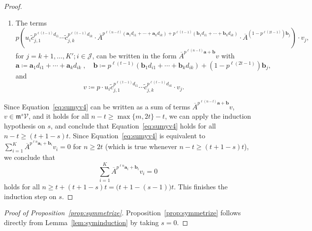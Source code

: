 \documentclass[letterpaper, 11pt, thm-restate]{article}
\numberwithin{equation}{section}
\newcommand{\mV}{\mathcal{V}}
\newcommand{\mJ}{\mathcal{J}}
\newcommand{\ba}{\boldsymbol{a}}
\newcommand{\bb}{\boldsymbol{b}}
\newcommand{\tc}{\widetilde{c}}
\newcommand{\oA}{\overline{A}}
\newcommand{\frm}{\mathfrak{m}}
\theoremstyle{definition}
\theoremstyle{definition}
\theoremstyle{definition}
\begin{document}
\begin{proof}
\begin{enumerate}[nosep, label=(\roman*)]
    the terms $\oA^{p^{\ell n} \ba_i + \bb_i} w_i, i = 1, \ldots, k$, can be written in the form $\oA^{p^{\ell (n-t)} \ba + \bb} v$, with
    \[
    \ba \coloneqq (p^{\ell n} - p^{\ell (n-t)}) \ba_i \;, \quad \bb \coloneqq \bb_i \;, \quad v \coloneqq w_i.
    \]
    Similarly, the terms $\oA^{p^{\ell n} \ba_i + \bb_i} v_i, i = K'+1, \ldots, K$, can be written in the form $\oA^{p^{\ell (n-t)} \ba + \bb} v$.
    \item
    The terms
    \[
    p \left( u_{i} \tc_{j,1}^{p^{\ell (t-1)}d_{i1}} \cdots \tc_{j,k}^{p^{\ell (t-1)} d_{ik}} \cdot \oA^{p^{\ell (n-t)}(\ba_1 d_{i1} + \cdots + \ba_k d_{ik}) + p^{\ell (t-1)} (\bb_1 d_{i1} + \cdots + \bb_k d_{ik})} \cdot \oA^{(1 - p^{\ell (2t-1)}) \bb_j} \right) \cdot v_j,
    \]
    for $j = k+1, \ldots, K'; i \in \mJ$,
    can be written in the form $\oA^{p^{\ell (n-t)} \ba + \bb} v$ with
    \[
    \ba \coloneqq \ba_1 d_{i1} + \cdots + \ba_k d_{ik} \;, \quad \bb \coloneqq p^{\ell (t-1)} (\bb_1 d_{i1} + \cdots + \bb_k d_{ik}) + (1 - p^{\ell (2t-1)}) \bb_j,
    \]
    and
    \[
    v \coloneqq p \cdot u_{i} \tc_{j,1}^{p^{\ell (t-1)}d_{i1}} \cdots \tc_{j,k}^{p^{\ell (t-1)} d_{ik}} \cdot v_j.
    \]
    \end{enumerate}
    
    Since Equation~\eqref{eq:sumyv4} can be written as a sum of terms $\oA^{p^{\ell (n-t)} \ba + \bb} v$, $v \in \frm^s \mV$, and it holds for all $n - t \geq \max\{m, 2t\} - t$, we can apply the induction hypothesis on $s$, and conclude that Equation~\eqref{eq:sumyv4} holds for all $n - t \geq (t+1-s)t$.
    Since Equation~\eqref{eq:sumyv4} is equivalent to $\sum_{i = 1}^K \oA^{p^{\ell n} \ba_i + \bb_i} v_i = 0$ for $n \geq 2t$ (which is true whenever $n - t \geq (t+1-s)t$), we conclude that 
    \[
    \sum_{i = 1}^K \oA^{p^{\ell n} \ba_i + \bb_i} v_i = 0
    \]
    holds for all $n \geq t+ (t+1-s)t = \big(t+1 - (s-1)\big) t$.
    This finishes the induction step on $s$.
\end{proof}

\begin{proof}[Proof of Proposition~\ref{prop:symmetrize}]
    Proposition~\ref{prop:symmetrize} follows directly from Lemma~\ref{lem:syminduction} by taking $s = 0$.
\end{proof}
\end{document}
